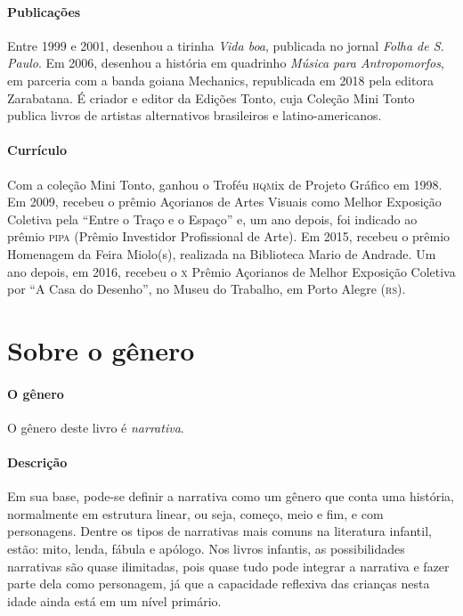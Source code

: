 \documentclass[11pt]{extarticle}
\begin{document}
\paragraph{Publicações} Entre 1999 e 2001, desenhou a tirinha \textit{Vida boa}, publicada no jornal \textit{Folha de S.\,Paulo}. Em 2006, desenhou a história em quadrinho \textit{Música para Antropomorfos}, em parceria com a banda goiana Mechanics, republicada em 2018 pela editora Zarabatana. É criador e editor da Edições Tonto, cuja Coleção Mini Tonto publica livros de artistas alternativos brasileiros e latino-americanos.

\paragraph{Currículo} Com a coleção Mini Tonto, ganhou o Troféu \textsc{hqm}ix de Projeto Gráfico em 1998. Em 2009, recebeu o prêmio Açorianos de Artes Visuais como Melhor Exposição Coletiva pela “Entre o Traço e o Espaço” e, um ano depois, foi indicado ao prêmio \textsc{pipa} (Prêmio Investidor Profissional de Arte). Em 2015, recebeu o prêmio Homenagem da Feira Miolo(s), realizada na Biblioteca Mario de Andrade. Um ano depois, em 2016, recebeu o \textsc{x} Prêmio Açorianos de Melhor Exposição Coletiva por “A Casa do Desenho”, no Museu do Trabalho, em Porto Alegre (\textsc{rs}).


\section{Sobre o gênero}

\paragraph{O gênero} O gênero deste livro é \textit{narrativa}. 

\paragraph{Descrição} Em sua base, pode-se definir a narrativa como um gênero que conta uma história, normalmente em estrutura linear, ou seja, começo, meio e fim, e com personagens. 
Dentre os tipos de narrativas mais comuns na literatura infantil, estão: mito, lenda, 
fábula e apólogo. Nos livros infantis, as possibilidades narrativas são quase ilimitadas, pois quase tudo pode integrar a narrativa e fazer parte dela como personagem, já que a capacidade reflexiva das crianças nesta idade ainda está em um nível primário. 
\end{document}
